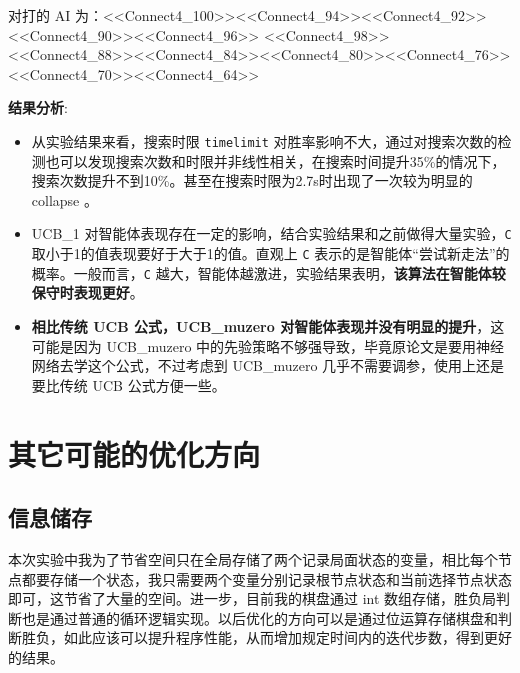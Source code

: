 \documentclass{article}
\begin{document}
\begin{spacing}{1.1}
	对打的 AI 为：<<Connect4\_100>><<Connect4\_94>><<Connect4\_92>><<Connect4\_90>><<Connect4\_96>>
	<<Connect4\_98>><<Connect4\_88>><<Connect4\_84>><<Connect4\_80>><<Connect4\_76>>
	<<Connect4\_70>><<Connect4\_64>>

	\textbf{结果分析}:
	\begin{itemize}
	\item 从实验结果来看，搜索时限 \verb|timelimit| 对胜率影响不大，通过对搜索次数的检测也可以发现搜索次数和时限并非线性相关，在搜索时间提升35\%的情况下，搜索次数提升不到10\%。甚至在搜索时限为2.7s时出现了一次较为明显的 collapse 。
	\item  UCB\_1 对智能体表现存在一定的影响，结合实验结果和之前做得大量实验，\verb|C| 取小于1的值表现要好于大于1的值。直观上 \verb|C| 表示的是智能体“尝试新走法”的概率。一般而言，\verb|C| 越大，智能体越激进，实验结果表明，\textbf{该算法在智能体较保守时表现更好}。
	\item \textbf{相比传统 UCB 公式，UCB\_muzero 对智能体表现并没有明显的提升}，这可能是因为 UCB\_muzero 中的先验策略不够强导致，毕竟原论文是要用神经网络去学这个公式，不过考虑到 UCB\_muzero 几乎不需要调参，使用上还是要比传统 UCB 公式方便一些。
	\end{itemize}
\section{其它可能的优化方向}
	\subsection{信息储存}
	\hspace{1.4em}
	本次实验中我为了节省空间只在全局存储了两个记录局面状态的变量，相比每个节点都要存储一个状态，我只需要两个变量分别记录根节点状态和当前选择节点状态即可，这节省了大量的空间。进一步，目前我的棋盘通过 int 数组存储，胜负局判断也是通过普通的循环逻辑实现。以后优化的方向可以是通过位运算存储棋盘和判断胜负，如此应该可以提升程序性能，从而增加规定时间内的迭代步数，得到更好的结果。

\end{spacing}
\end{document}
